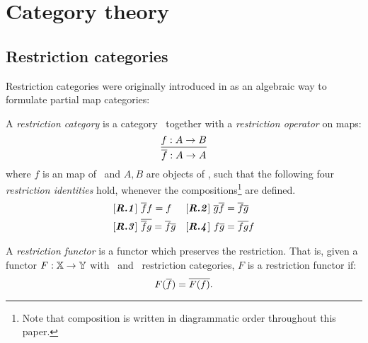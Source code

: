 
\chapter{Category theory}\label{chap:category_theory}
\section{Restriction categories} %
  \label{sec:restriction_categories}


  Restriction categories were originally introduced in
   \cite{cockett2002:restcategories1} as an algebraic way to formulate
  partial map categories:
  \begin{definition}
    A \emph{restriction category} is a category \X\ together with a \emph{restriction operator} on
    maps:
    \[
      \infer{\restr{f}:A\to A}{f:A \to B}
    \]
    where $f$ is an map of \X\ and $A,B$ are objects of \X, such that the
    following four \emph{restriction identities} hold, whenever the
    compositions\footnote{Note that composition is
    written in diagrammatic order throughout this paper.} are defined.
    \begin{align*}
      &[\text{\emph{\bfseries R.1}}]\ \overline{f} f = f & &
      [\text{\emph{\textbf{R.2}}}]\ \overline{g}  \overline{f} = \overline{f}  \overline{g}\\
      &[\text{\emph{\textbf{R.3}}}]\ \overline{\overline{f}  g} = \overline{f}   \overline{g} & &
      [\text{\emph{\textbf{R.4}}}]\  f \overline{g} = \overline{f g} f
    \end{align*}
  \end{definition}

  \begin{definition}
    A \emph{restriction functor} is a functor which preserves the restriction. That is,
    given a functor $F: \mathbb{X} \to \mathbb{Y}$ with \X\  and \Y\ restriction categories,
    $F$ is a restriction functor if:
    \[ 
      F(\overline{f}) = \overline{F(f)}.
    \]
  \end{definition}

